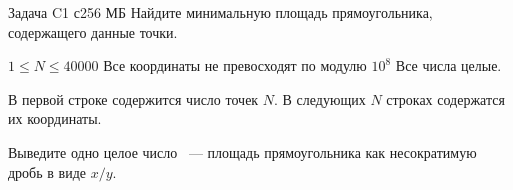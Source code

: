 \begin{problem}{Задача C}{1 с}{256 МБ}
Найдите минимальную площадь прямоугольника, содержащего данные точки.
\Limit

$1 \le N \le 40000$
Все координаты не превосходят по модулю $10^8$
Все числа целые.

\InputFile
В первой строке содержится число точек $N$.
В следующих $N$ строках содержатся их координаты.

\OutputFile
Выведите одно целое число ~--- площадь прямоугольника как несократимую дробь
в виде $x/y$.

\Example
\begin{example}
\end{example}
\end{problem}
